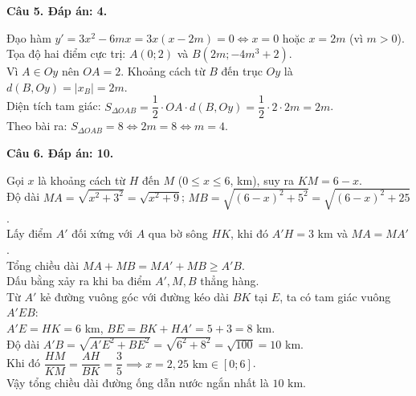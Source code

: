 \documentclass[12pt,a4paper]{article}
\newcommand{\loigiai}[1]{\par\medskip\Needspace{3\baselineskip}\noindent\textbf{#1}\par\nobreak}
\begin{document}
\newpage
\loigiai{Câu 5. Đáp án: 4.}
Đạo hàm $y'=3x^2-6mx=3x(x-2m)=0\Leftrightarrow x=0$ hoặc $x=2m$ (vì $m>0$).\\
Tọa độ hai điểm cực trị: $A(0;2)$ và $B(2m;-4m^3+2)$.\\
Vì $A\in Oy$ nên $OA=2$. Khoảng cách từ $B$ đến trục $Oy$ là $d(B,Oy)=|x_B|=2m$.\\
Diện tích tam giác: $S_{\Delta OAB}=\dfrac{1}{2}\cdot OA\cdot d(B,Oy)=\dfrac{1}{2}\cdot 2\cdot 2m=2m$.\\
Theo bài ra: $S_{\Delta OAB}=8\Leftrightarrow 2m=8\Leftrightarrow m=4$.

\loigiai{Câu 6. Đáp án: 10.}
Gọi $x$ là khoảng cách từ $H$ đến $M$ ($0\le x\le6$, km), suy ra $KM=6-x$.\\
Độ dài $MA=\sqrt{x^2+3^2}=\sqrt{x^2+9}$; $MB=\sqrt{(6-x)^2+5^2}=\sqrt{(6-x)^2+25}$.\\
Lấy điểm $A'$ đối xứng với $A$ qua bờ sông $HK$, khi đó $A'H=3$ km và $MA=MA'$.\\
Tổng chiều dài $MA+MB=MA'+MB\ge A'B$.\\
Dấu bằng xảy ra khi ba điểm $A',M,B$ thẳng hàng.\\
Từ $A'$ kẻ đường vuông góc với đường kéo dài $BK$ tại $E$, ta có tam giác vuông $A'EB$:\\
$A'E=HK=6$ km, $BE=BK+HA'=5+3=8$ km.\\
Độ dài $A'B=\sqrt{A'E^2+BE^2}=\sqrt{6^2+8^2}=\sqrt{100}=10$ km.\\
Khi đó $\dfrac{HM}{KM}=\dfrac{AH}{BK}=\dfrac{3}{5}\implies x=2{,}25\text{ km}\in[0;6]$.\\
Vậy tổng chiều dài đường ống dẫn nước ngắn nhất là $10\text{ km}$.
\end{document}
